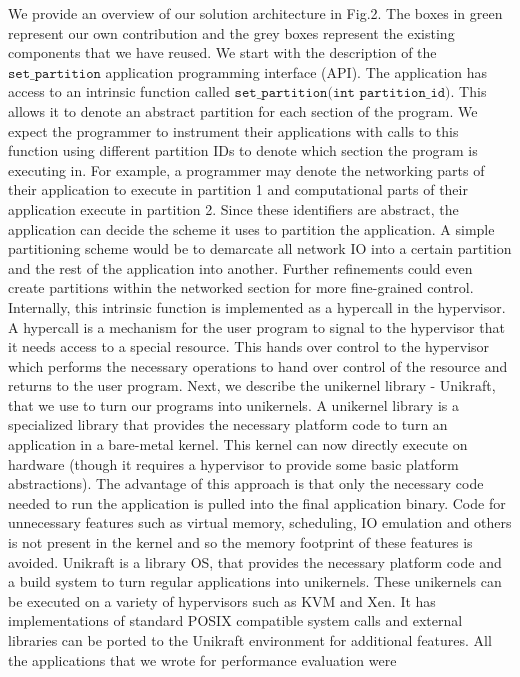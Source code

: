 \documentclass[sigconf,authorversion,noacm]{acmart}
\begin{document}
We provide an overview of our solution architecture in Fig.2. The boxes in green
represent our own contribution and the grey boxes represent the existing
components that we have reused. We start with the description of the
$\texttt{set\_partition}$ application programming interface (API). The
application has access to an intrinsic function called
$\texttt{set\_partition(int partition\_id)}$. This allows it to denote an
abstract partition for each section of the program. We expect the programmer to
instrument their applications with calls to this function using different
partition IDs to denote which section the program is executing in. For example,
a programmer may denote the networking parts of their application to execute in
partition 1 and computational parts of their application execute in partition 2.
Since these identifiers are abstract, the application can decide the scheme it
uses to partition the application. A simple partitioning scheme would be to
demarcate all network IO into a certain partition and the rest of the
application into another. Further refinements could even create partitions
within the networked section for more fine-grained control. Internally, this
intrinsic function is implemented as a hypercall in the hypervisor. A hypercall
is a mechanism for the user program to signal to the hypervisor that it needs
access to a special resource. This hands over control to the hypervisor which
performs the necessary operations to hand over control of the resource and
returns to the user program. Next, we describe the unikernel library - Unikraft,
that we use to turn our programs into unikernels. A unikernel library is a
specialized library that provides the necessary platform code to turn an
application in a bare-metal kernel. This kernel can now directly execute
on hardware (though it requires a hypervisor to provide some basic platform
abstractions). The advantage of this approach is that only the necessary code
needed to run the application is pulled into the final application binary.
Code for unnecessary features such as virtual memory, scheduling, IO emulation
and others is not present in the kernel and so the memory footprint of these
features is avoided. Unikraft \cite{unikraft} is a library OS, that provides the
necessary platform code and a build system to turn regular applications into
unikernels. These unikernels can be executed on a variety of hypervisors such as
KVM and Xen. It has implementations of standard POSIX compatible system calls
and external libraries can be ported to the Unikraft environment for additional
features. All the applications that we wrote for performance evaluation were
\end{document}
